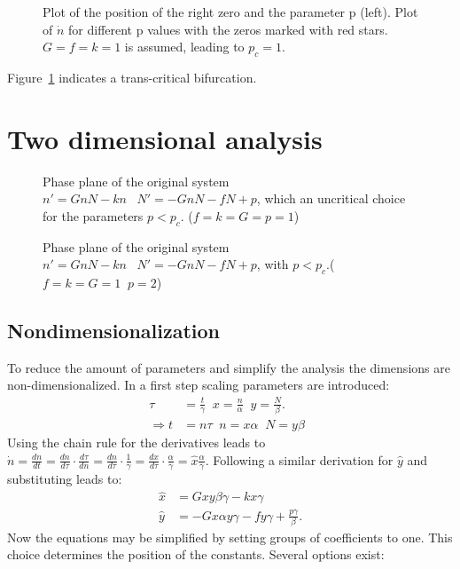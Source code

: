 \begin{figure}

\caption{Plot of the position of the right zero and the parameter p (left). Plot of $\dot{n}$ for different p values with the zeros marked with red stars. $G=f=k=1$ is assumed, leading to $p_c = 1$.}
\label{fig:transBif}
\end{figure}
Figure~\ref{fig:transBif} indicates a trans-critical bifurcation.

\section{Two dimensional analysis}
\begin{figure}

\caption{Phase plane of the original system $n ' = G n N - k n \;\;\; N ' = - G n N - f N + p$, which an uncritical choice for the parameters $p < p_c$. ($f=k=G=p=1$)}

\caption{Phase plane of the original system $n ' = G n N - k n \;\;\; N ' = - G n N - f N + p$, with $p < p_c$.($f=k=G=1\;\;p=2$)}

\end{figure}
\subsection{Nondimensionalization}
To reduce the amount of parameters and simplify the analysis the dimensions are non-dimensionalized. In a first step scaling parameters are introduced:
\begin{align}
\tau &= \frac{t}{\gamma} \;\; x = \frac{n}{\alpha} \;\; y = \frac{N}{\beta}. \\
\Rightarrow t &= n\tau \;\;  n = x\alpha \;\; N = y\beta \;\;  
\end{align}
Using the chain rule for the derivatives leads to $\dot{n} = \frac{dn}{dt} = \frac{dn}{d\tau} \cdot \frac{d\tau}{dn} = \frac{dn}{d\tau} \cdot \frac{1}{\gamma} = \frac{dx}{d\tau} \cdot  \frac{\alpha}{\gamma} = \hat{x} \frac{\alpha}{\gamma}$. 
Following a similar derivation for $\hat{y}$ and substituting leads to:
\begin{align}
\hat{x} &= Gxy\beta \gamma - kx\gamma \label{eq:DimOne} \\ 
\hat{y} &= -Gx\alpha y \gamma - fy \gamma + \frac{p\gamma}{\beta} \label{eq:DimTwo}.
\end{align}
Now the equations may be simplified by setting groups of coefficients to one. This choice determines the position of the constants. Several options exist: 
